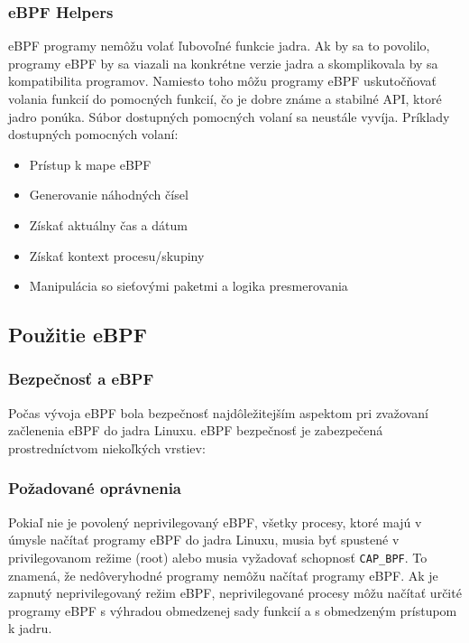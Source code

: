 \subsubsection{eBPF Helpers}
eBPF programy nemôžu volať ľubovoľné funkcie jadra. Ak by sa to povolilo, programy eBPF by sa viazali na konkrétne verzie jadra a skomplikovala by sa kompatibilita programov. Namiesto toho môžu programy eBPF uskutočňovať volania funkcií do pomocných funkcií, čo je dobre známe a stabilné API, ktoré jadro ponúka.
Súbor dostupných pomocných volaní sa neustále vyvíja. Príklady dostupných pomocných volaní:
\begin{itemize}
\item Prístup k mape eBPF
\item Generovanie náhodných čísel
\item Získať aktuálny čas a dátum
\item Získať kontext procesu/skupiny
\item Manipulácia so sieťovými paketmi a logika presmerovania
\end{itemize}

\subsection{Použitie eBPF}
\subsubsection{Bezpečnosť a eBPF}
Počas vývoja eBPF bola bezpečnosť najdôležitejším aspektom pri zvažovaní začlenenia eBPF do jadra Linuxu. 
eBPF bezpečnosť je zabezpečená prostredníctvom niekoľkých vrstiev:

\subsubsection*{Požadované oprávnenia}
Pokiaľ nie je povolený neprivilegovaný eBPF, všetky procesy, ktoré majú v úmysle načítať programy eBPF do jadra Linuxu, musia byť spustené v privilegovanom režime (root) alebo musia vyžadovať schopnosť \texttt{CAP\_BPF}. To znamená, že nedôveryhodné programy nemôžu načítať programy eBPF.
Ak je zapnutý neprivilegovaný režim eBPF, neprivilegované procesy môžu načítať určité programy eBPF s výhradou obmedzenej sady funkcií a s obmedzeným prístupom k jadru.

